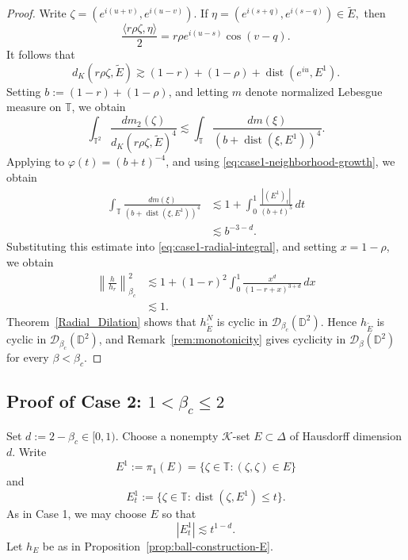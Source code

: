 \documentclass[a4paper,12pt]{amsart}
\theoremstyle{definition}
\begin{document}
\begin{proof}
Write
$
    \zeta=(e^{i(u+v)},e^{i(u-v)}).
$
If
$
    \eta=(e^{i(s+q)},e^{i(s-q)})\in\widetilde E,
$
then
\[
    \frac{\langle r\rho\zeta,\eta\rangle}{2}
    =r\rho e^{i(u-s)}\cos(v-q).
\]
It follows that
\[
    d_K(r\rho\zeta,\widetilde E)
    \gtrsim
    (1-r)+(1-\rho)+\operatorname{dist}(e^{iu},E^1).
\]
Setting $b:=(1-r)+(1-\rho)$, and letting $m$ denote normalized
Lebesgue measure on $\mathbb T$, we obtain
\[
    \int_{\mathbb T^2}
    \frac{dm_2(\zeta)}
         {d_K(r\rho\zeta,\widetilde E)^4}
    \lesssim
    \int_{\mathbb T}
    \frac{dm(\xi)}
         {(b+\operatorname{dist}(\xi,E^1))^4}.
\]
Applying \cite[Exercise~9.4.1]{ElFallah2014_book} to
$\varphi(t)=(b+t)^{-4}$, and using
\eqref{eq:case1-neighborhood-growth}, we obtain
\[
\begin{aligned}
    \int_{\mathbb T}
    \frac{dm(\xi)}
         {(b+\operatorname{dist}(\xi,E^1))^4}
    &\lesssim
    1+\int_0^1
    \frac{|(E^1)_t|}{(b+t)^5}\,dt \\
    &\lesssim b^{-3-d}.
\end{aligned}
\]
Substituting this estimate into
\eqref{eq:case1-radial-integral}, and setting $x=1-\rho$, we obtain
\[
\begin{aligned}
    \left\|\frac{h}{h_r}\right\|_{\beta_c}^2
    &\lesssim
    1+(1-r)^2
    \int_0^1
    \frac{x^d}{(1-r+x)^{3+d}}\,dx \\
    &\lesssim1.
\end{aligned}
\]
Theorem~\ref{Radial_Dilation} shows that $h_{\widetilde E}^N$ is
cyclic in $\mathcal D_{\beta_c}(\mathbb D^2)$. Hence $h_{\widetilde E}$ is cyclic in
$\mathcal D_{\beta_c}(\mathbb D^2)$, and
Remark~\ref{rem:monotonicity} gives cyclicity in
$\mathcal D_\beta(\mathbb D^2)$ for every $\beta<\beta_c$.
\end{proof}

\subsection[Case 2]{Proof of Case 2:
\texorpdfstring{$1<\beta_c\leq2$}{1 < beta\_c <= 2}}
Set $d:=2-\beta_c\in[0,1)$. Choose a nonempty $\mathcal K$-set
$E\subset\Delta$ of Hausdorff dimension $d$. Write
\[
    E^1:=\pi_1(E)
    =\{\zeta\in\mathbb T:(\zeta,\zeta)\in E\}
\]
and
\[
    E^1_t
    :=\{\zeta\in\mathbb T:
          \operatorname{dist}(\zeta,E^1)\leq t\}.
\]
As in Case 1, we may choose $E$ so that
\begin{equation}
    |E^1_t|\lesssim t^{1-d}.
    \label{eq:case2-neighborhood-growth}
\end{equation}
Let $h_E$ be as in
Proposition~\ref{prop:ball-construction-E}.
\end{document}

